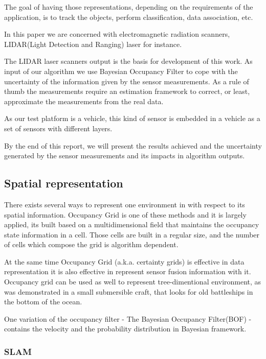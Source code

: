 The goal of having those representations, depending on the requirements of the application, is to track the objects, perform classification, data association, etc.

In this paper we are concerned with electromagnetic radiation scanners, LIDAR(Light Detection and Ranging) laser for instance.

The LIDAR laser scanners output is the basis for development of this work. As input of our algorithm we use Bayesian Occupancy Filter \cite{TAY-2008-295084} to cope with the uncertainty of the information given by the sensor measurements. As a rule of thumb the measurements require an estimation framework to correct, or least, approximate the measurements from the real data.

As our test platform is a vehicle, this kind of sensor is embedded in a vehicle as a set of sensors with different layers.

By the end of this report, we will present the results achieved and the uncertainty generated by the sensor measurements and its impacts in algorithm outputs.

\subsection{Spatial representation}

There exists several ways to represent one environment in with respect to its spatial information. Occupancy Grid is one of these methods and it is largely applied, its built based on a multidimensional field that maintains the occupancy state information in a cell\cite{Elfes:1989:UOG:68491.68495}. Those cells are built in a regular size, and the number of cells which compose the grid is algorithm dependent. 

At the same time Occupancy Grid (a.k.a. certainty grids) is effective in data representation it is also effective in represent sensor fusion information with it. Occupancy grid can be used as well to represent tree-dimentional environment, as was demonstrated in a small submersible craft, that looks for old battleships in the bottom of the ocean\cite{DBLP:journals/aim/Moravec88}.

One variation of the occupancy filter - The Bayesian Occupancy Filter(BOF) - contains the velocity and the probability distribution in Bayesian framework.


\subsubsection{SLAM}

